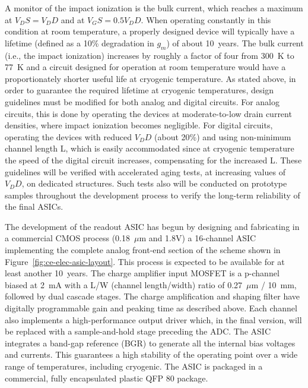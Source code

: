 A monitor of the impact ionization is the bulk current, which reaches a maximum at $V_DS = V_DD$ and at $V_GS = 0.5 V_DD$. 
When operating constantly in this condition at room temperature, a properly designed device 
will typically have a lifetime (defined as a 10\% degradation in $g_m$) of about 10~years. 
The bulk current (i.e., the impact ionization) increases by roughly a factor of four from 300~K to 77~K 
\cite{CMOS-reliability} and a circuit designed for operation at room temperature would have 
a proportionately shorter useful life at cryogenic temperature. As stated above, in order to guarantee 
the required lifetime at cryogenic temperatures, design guidelines must be modified for both analog 
and digital circuits. For analog circuits, this is done by operating the devices at moderate-to-low 
drain current densities, where impact ionization becomes negligible. For digital circuits, 
operating the devices with reduced $V_DD$ (about 20\%) and using non-minimum channel length L, 
which is easily accommodated since at cryogenic temperature the speed of the digital circuit increases, 
compensating for the increased L. These guidelines will be verified with accelerated aging tests, 
at increasing values of $V_DD$, on dedicated structures. Such tests also will be conducted on 
prototype samples throughout the development process to verify the long-term reliability of the final ASICs.

The development of the readout ASIC has begun by designing and fabricating in a commercial CMOS
process (0.18~$\mu$m and 1.8V) a 16-channel
ASIC implementing the complete analog front-end section of the scheme shown in Figure~\ref{fig:ce-elec-asic-layout}. 
This process is expected to be available for at least another 10~years. 
The charge amplifier input MOSFET is a p-channel biased at 2~mA with a L/W (channel length/width) ratio
of 0.27~$\mu$m / 10~mm, followed by dual cascade stages.
The charge amplification and shaping filter have
digitally programmable gain and peaking time as described above.
Each channel also implements a high-performance output driver which, in the
final version, will be replaced with a sample-and-hold stage preceding the ADC.
The ASIC integrates a band-gap reference (BGR)  to generate all the internal bias voltages and currents.
This guarantees a high stability of the operating point over a wide range of
temperatures, including cryogenic.
The ASIC is packaged in a commercial, fully encapsulated plastic QFP 80 package.

